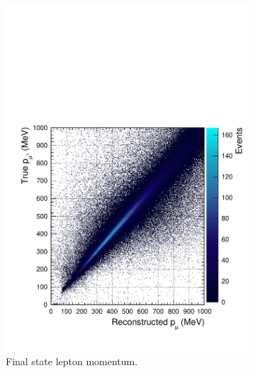 \begin{figure}[t]
\centering
\begin{subfigure}{.5\textwidth}
  \centering
  \includegraphics[width=0.95\linewidth]{figs/momres2d}
  \caption{Final state lepton momentum.}
  \label{fig:momres2d}
\end{subfigure}%
\begin{subfigure}{.5\textwidth}
  \centering

\end{subfigure}
\end{figure}
